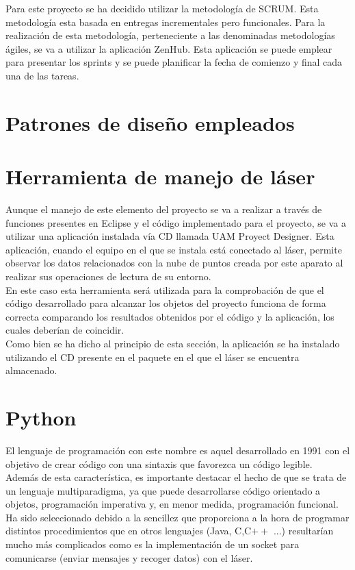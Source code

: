 Para este proyecto se ha decidido utilizar la metodología de SCRUM. Esta metodología esta basada en entregas incrementales pero funcionales. Para la realización de esta metodología, perteneciente a las denominadas metodologías ágiles, se va a utilizar la aplicación ZenHub. Esta aplicación se puede emplear para presentar los sprints y se puede planificar la fecha de comienzo y final cada una de las tareas.

\section{Patrones de diseño empleados}



\section{Herramienta de manejo de láser}

Aunque el manejo de este elemento del proyecto se va a realizar a través de funciones presentes en Eclipse y el código implementado para el proyecto, se va a utilizar una aplicación instalada vía CD llamada UAM Proyect Designer. Esta aplicación, cuando el equipo en el que se instala está conectado al láser, permite observar los datos relacionados con la nube de puntos creada por este aparato al realizar sus operaciones de lectura de su entorno.\\
En este caso esta herramienta será utilizada para la comprobación de que el código desarrollado para alcanzar los objetos del proyecto funciona de forma correcta comparando los resultados obtenidos por el código y la aplicación, los cuales deberían de coincidir.\\
Como bien se ha dicho al principio de esta sección, la aplicación se ha instalado utilizando el CD presente en el paquete en el que el láser se encuentra almacenado. 

\section{Python}

El lenguaje de programación con este nombre es aquel desarrollado en 1991 con el objetivo de crear código con una sintaxis que favorezca un código legible.\\
Además de esta característica, es importante destacar el hecho de que se trata de un lenguaje multiparadigma, ya que puede desarrollarse código orientado a objetos, programación imperativa y, en menor medida, programación funcional. \\
Ha sido seleccionado debido a la sencillez que proporciona a la hora de programar distintos procedimientos que en otros lenguajes (Java, C,C$ ++$ ...) resultarían mucho más complicados como es la implementación de un socket para comunicarse (enviar mensajes y recoger datos) con el láser.

